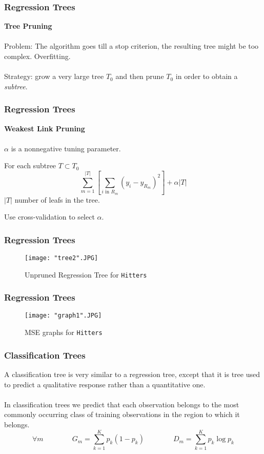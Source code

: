 \documentclass{beamer}
\begin{document}
\begin{frame}
\frametitle{Regression Trees}

\textbf{Tree Pruning} 
\\~\\
Problem: The algorithm goes till a stop criterion, the resulting tree might be too complex. Overfitting.
\\~\\
Strategy: grow a very large tree $T_0$ and then prune $T_0$ in order to obtain a \textit{subtree}.

\end{frame} 




\begin{frame}
\frametitle{Regression Trees}

\textbf{Weakest Link Pruning} 
\\~\\
$ \alpha $ is a nonnegative tuning parameter.


For each subtree $T  \subset T_0 $
$$ \sum\limits_{m=1}^{|T|}  \left[ \sum\limits_{i \text{ in } R_m  } ( y_i - y_{R_m}  )^2   \right]  + \alpha |T| $$
$|T|$ number of leafs in the tree.

Use cross-validation to select $ \alpha $.


\end{frame} 



\begin{frame}
\frametitle{Regression Trees}
\begin{figure}[H]
\caption{Unpruned Regression Tree for \texttt{Hitters}}
\texttt{[image: "tree2".JPG]} 
\end{figure}
\end{frame} 


\begin{frame}
\frametitle{Regression Trees}
\begin{figure}[H]
\caption{MSE graphs for \texttt{Hitters}}
\texttt{[image: "graph1".JPG]} 
\end{figure}
\end{frame} 


\begin{frame}
\frametitle{Classification Trees}

A classification tree is very similar to a regression tree, except that it is tree used to predict a qualitative response rather than a quantitative one. 
\\~\\
In classification trees we predict that each observation belongs to the most commonly occurring class of training observations in the region to which it belongs.
$$ \forall m \quad\quad\quad\quad 	G_m = \sum\limits_{k=1}^{K} p_k (1-p_k)  \quad\quad\quad\quad  D_m =  \sum\limits_{k=1}^{K} p_k \log p_k $$

\end{frame} 
\end{document}

